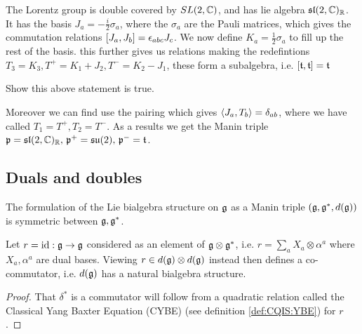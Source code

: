 \documentclass{article}
\begin{document}
\begin{example}
The Lorentz group is double covered by $SL(2,\mbb{C})$, and has lie algebra $\mf{sl}(2,\mbb{C})_\mbb{R}$. It has the basis $J_a = -\frac{i}{2}\sigma_a$, where the $\sigma_a$ are the Pauli matrices, which gives the commutation relations $\comm[J_a]{J_b} = \eps_{abc}J_c$. We now define $K_a = \frac{1}{2}\sigma_a$ to fill up the rest of the basis. this further gives us relations 
making the redefintions $T_3 = K_3, T^+  = K_1 + J_2, T^- = K_2 - J_1$, these form a subalgebra, i.e. $\comm[\mf{t}]{\mf{t}} = \mf{t}$

\begin{ex}
Show this above statement is true.
\end{ex}

Moreover we can find use the pairing 
which gives $\pangle{J_a,T_b} = \delta_{ab}$, where we have called $T_1 = T^+, T_2 = T^-$. As a results we get the Manin triple $\mf{p} = \mf{sl}(2,\mbb{C})_\mbb{R}, \, \mf{p}^+ = \mf{su}(2), \, \mf{p}^- = \mf{t}$. 
\end{example}

\subsection{Duals and doubles}
The formulation of the Lie bialgebra structure on $\mf{g}$ as a Manin triple $(\mf{g},\mf{g}^\ast,d(\mf{g}))$ is symmetric between $\mf{g}, \mf{g}^\ast$. 
\begin{prop}\label{prop:CQIS:naturalr}
Let $r=\id : \mf{g} \to \mf{g}$ considered as an element of $\mf{g} \otimes \mf{g}^\ast$, i.e. $r = \sum_a X_a \otimes \alpha^a$ where $X_a, \alpha^a$ are dual bases. Viewing $r\in d(\mf{g}) \otimes d(\mf{g})$ instead then 
defines a co-commutator, i.e. $d(\mf{g})$ has a natural bialgebra structure. 
\end{prop}
\begin{proof}
That $\delta^\ast$ is a commutator will follow from a quadratic relation called the Classical Yang Baxter Equation (CYBE) (see definition \ref{def:CQIS:YBE}) for $r$. 
\end{proof}
\end{document}
